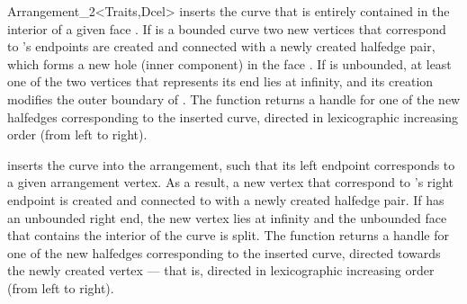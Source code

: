 \begin{ccRefClass}{Arrangement_2<Traits,Dcel>}
   {inserts the curve  that is entirely contained in the interior
    of a given face . If  is a bounded curve two new vertices
    that correspond to 's endpoints are created and connected with a
    newly created halfedge pair, which forms a new hole (inner component)
    in the face . If  is unbounded, at least one of the two
    vertices that represents its end lies at infinity, and its creation
    modifies the outer boundary of .
    The function returns a handle for one of the new halfedges
    corresponding to the inserted curve, directed in lexicographic
    increasing order (from left to right).
    }

  {inserts the curve  into the arrangement, such that its left
   endpoint corresponds to a given arrangement vertex. As a result, a new
   vertex that correspond to 's right endpoint is created and
   connected to  with a newly created halfedge pair. If  has
   an unbounded right end, the new vertex lies at infinity and the
   unbounded face that contains the interior of the curve is split. 
   The function returns a handle for one of the new halfedges corresponding
   to the inserted curve, directed towards the newly created vertex ---
   that is, directed in lexicographic increasing order (from left to right).
   }


\end{ccRefClass}
